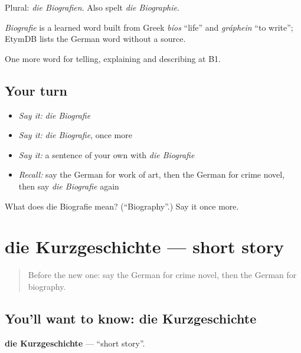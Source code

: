 Plural: \emph{die Biografien}. Also spelt \emph{die Biographie}.

\begin{cousinweb}
\emph{Biografie} is a learned word built from Greek \emph{bíos} \textquotedblleft{}life\textquotedblright{} and \emph{gráphein} \textquotedblleft{}to write\textquotedblright{}; EtymDB lists the German word without a source.
\end{cousinweb}

\begin{grammarlens}[title={What you've built}]
One more word for telling, explaining and describing at B1.
\end{grammarlens}

\subsection*{Your turn}
\begin{itemize}
\raggedright
  \item \emph{Say it:} \emph{die Biografie}
  \item \emph{Say it:} \emph{die Biografie}, once more
  \item \emph{Say it:} a sentence of your own with \emph{die Biografie}
  \item \emph{Recall:} say the German for work of art, then the German for crime novel, then say \emph{die Biografie} again
\end{itemize}

\begin{tcolorbox}[breakable,colback=teal!4,colframe=teal!35!black,title={Before you move on}]
What does die Biografie mean? (\textquotedblleft{}Biography\textquotedblright{}.) Say it once more.
\end{tcolorbox}
\section[die Kurzgeschichte]{die Kurzgeschichte — short story}

\label{lesson:GE-C520-kurzgeschichte}



\begin{quote}
Before the new one: say the German for crime novel, then the German for biography.
\end{quote}

\subsection*{You'll want to know: die Kurzgeschichte}
\textbf{die Kurzgeschichte} — \textquotedblleft{}short story\textquotedblright{}.

